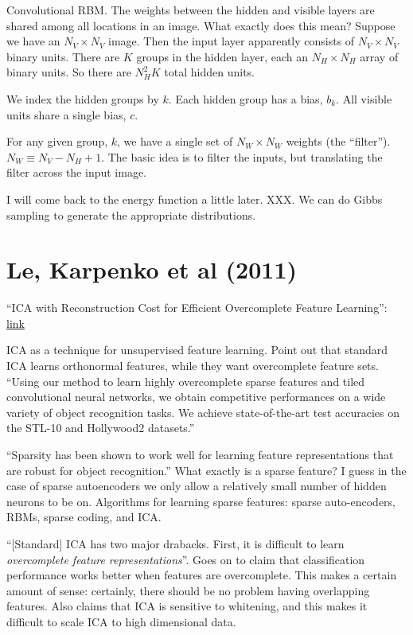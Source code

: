 \documentclass[12pt]{report}
\newcommand{\link}[2]{\href{#1}{#2}}
\begin{document}
Convolutional RBM. The weights between the hidden and visible layers
are shared among all locations in an image.  What exactly does this
mean?  Suppose we have an $N_V \times N_V$ image.  Then the input
layer apparently consists of $N_V \times N_V$ binary units.  There are
$K$ groups in the hidden layer, each an $N_H \times N_H$ array of
binary units.  So there are $N_H^2 K$ total hidden units.

We index the hidden groups by $k$.  Each hidden group has a bias,
$b_k$.  All visible units share a single bias, $c$.

For any given group, $k$, we have a single set of $N_W \times N_W$
weights (the ``filter'').  $N_W \equiv N_V-N_H+1$.  The basic idea is
to filter the inputs, but translating the filter across the input
image.

I will come back to the energy function a little later.  XXX.  We can
do Gibbs sampling to generate the appropriate distributions.

\section{Le, Karpenko et al (2011)}

``ICA with Reconstruction Cost for Efficient Overcomplete Feature
Learning'':
\link{http://ai.stanford.edu/~ang/papers/nips11-ICAReconstructionCost.pdf}{link}

ICA as a technique for unsupervised feature learning.  Point out that
standard ICA learns orthonormal features, while they want overcomplete
feature sets.  ``Using our method to learn highly overcomplete sparse
features and tiled convolutional neural networks, we obtain
competitive performances on a wide variety of object recognition
tasks.  We achieve state-of-the-art test accuracies on the STL-10 and
Hollywood2 datasets.''

``Sparsity has been shown to work well for learning feature
representations that are robust for object recognition.''  What
exactly is a sparse feature?  I guess in the case of sparse
autoencoders we only allow a relatively small number of hidden neurons
to be on.  Algorithms for learning sparse features: sparse
auto-encoders, RBMs, sparse coding, and ICA.

``[Standard] ICA has two major drabacks.  First, it is difficult to
learn \emph{overcomplete feature representations}''.  Goes on to claim
that classification performance works better when features are
overcomplete.  This makes a certain amount of sense: certainly, there
should be no problem having overlapping features.  Also claims that
ICA is sensitive to whitening, and this makes it difficult to scale
ICA to high dimensional data.
\end{document}
